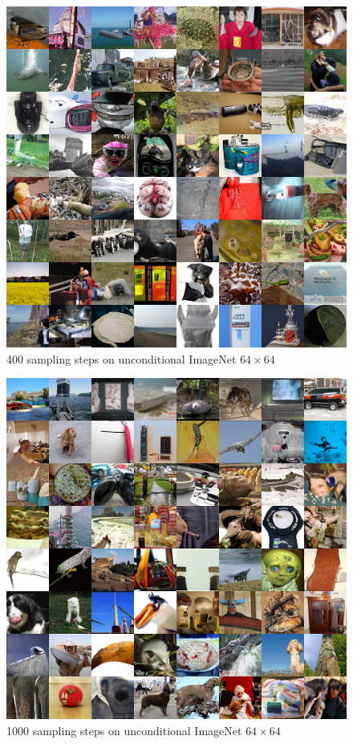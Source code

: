 \documentclass{article}
\begin{document}
\newpage
\begin{figure}[h!]
    \centerline{\includegraphics[width=0.78\columnwidth]{samples_hybrid_400steps_1.5M_grid.png}}
    \caption{400 sampling steps on unconditional ImageNet $64 \times 64$}
\end{figure}
\begin{figure}[h!]
    \centerline{\includegraphics[width=0.78\columnwidth]{samples_hybrid_1000steps_1.5M_grid.png}}
    \caption{1000 sampling steps on unconditional ImageNet $64 \times 64$}
\end{figure}
\end{document}
